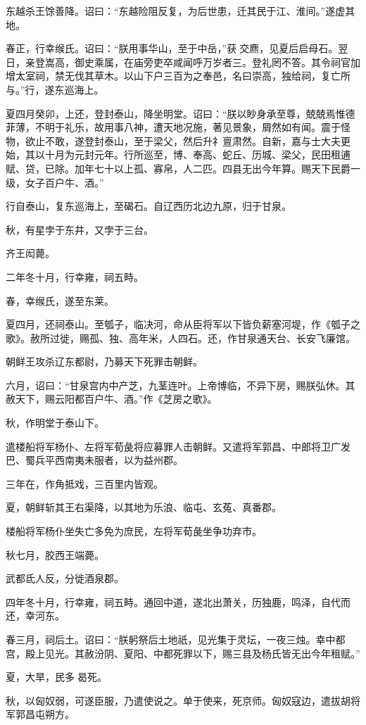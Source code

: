 \documentclass[]{article}
\begin{document}
东越杀王馀善降。诏曰：``东越险阻反复，为后世患，迁其民于江、淮间。''遂虚其地。

春正，行幸缑氏。诏曰：``朕用事华山，至于中岳，''获交麃，见夏后启母石。翌日，亲登嵩高，御史乘属，在庙旁吏卒咸闻呼万岁者三。登礼罔不答。其令祠官加增太室祠，禁无伐其草木。以山下户三百为之奉邑，名曰崇高，独给祠，复亡所与。''行，遂东巡海上。

夏四月癸卯，上还，登封泰山，降坐明堂。诏曰：``朕以眇身承至尊，兢兢焉惟德菲薄，不明于礼乐，故用事八神，遭天地况施，著见景象，屑然如有闻。震于怪物，欲止不敢，遂登封泰山，至于梁父，然后升礻亶肃然。自新，嘉与士大夫更始，其以十月为元封元年。行所巡至，博、奉高、蛇丘、历城、梁父，民田租逋赋、贷，已除。加年七十以上孤、寡帛，人二匹。四县无出今年算。赐天下民爵一级，女子百户牛、酒。''

行自泰山，复东巡海上，至碣石。自辽西历北边九原，归于甘泉。

秋，有星孛于东井，又孛于三台。

齐王闳薨。

二年冬十月，行幸雍，祠五畤。

春，幸缑氏，遂至东莱。

夏四月，还祠泰山。至瓠子，临决河，命从臣将军以下皆负薪塞河堤，作《瓠子之歌》。赦所过徙，赐孤、独、高年米，人四石。还，作甘泉通天台、长安飞廉馆。

朝鲜王攻杀辽东都尉，乃募天下死罪击朝鲜。

六月，诏曰：``甘泉宫内中产芝，九茎连叶。上帝博临，不异下房，赐朕弘休。其赦天下，赐云阳都百户牛、酒。''作《芝房之歌》。

秋，作明堂于泰山下。

遣楼船将军杨仆、左将军荀彘将应募罪人击朝鲜。又遣将军郭昌、中郎将卫广发巴、蜀兵平西南夷未服者，以为益州郡。

三年在，作角抵戏，三百里内皆观。

夏，朝鲜斩其王右渠降，以其地为乐浪、临屯、玄菟、真番郡。

楼船将军杨仆坐失亡多免为庶民，左将军荀彘坐争功弃市。

秋七月，胶西王端薨。

武都氐人反，分徙酒泉郡。

四年冬十月，行幸雍，祠五畤。通回中道，遂北出萧关，历独鹿，鸣泽，自代而还，幸河东。

春三月，祠后土。诏曰：``朕躬祭后土地祇，见光集于灵坛，一夜三烛。幸中都宫，殿上见光。其赦汾阴、夏阳、中都死罪以下，赐三县及杨氏皆无出今年租赋。''

夏，大旱，民多曷死。

秋，以匈奴弱，可遂臣服，乃遣使说之。单于使来，死京师。匈奴寇边，遣拔胡将军郭昌屯朔方。
\end{document}
